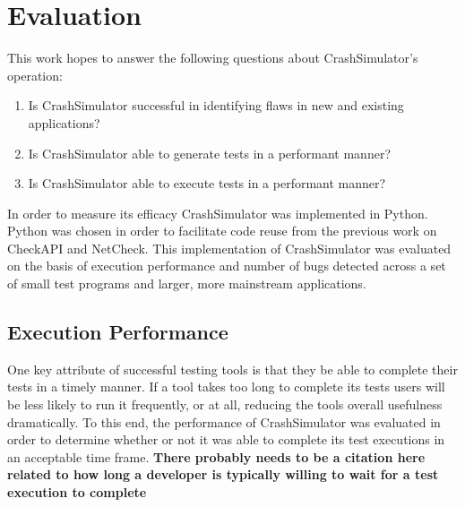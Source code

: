 

\section{Evaluation}

    This work hopes to answer the following questions about CrashSimulator's operation:

        \begin{enumerate}
            \item{Is CrashSimulator successful in identifying flaws in new and existing applications?}
            \item{Is CrashSimulator able to generate tests in a performant manner?}
            \item{Is CrashSimulator able to execute tests in a performant manner?}
        \end{enumerate}
        In order to measure its efficacy CrashSimulator was implemented in Python. Python was chosen in order to facilitate
    code reuse from the previous work on CheckAPI and NetCheck. This implementation of CrashSimulator was evaluated on
    the basis of execution performance and number of bugs detected across a set of small test programs and larger, more
    mainstream applications.

    \subsection{Execution Performance}

        One key attribute of successful testing tools is that they be able to complete their tests in a timely manner.
        If a tool takes too long to complete its tests users will be less likely to run it frequently, or at all,
        reducing the tools overall usefulness dramatically. To this end, the performance of CrashSimulator was evaluated
        in order to determine whether or not it was able to complete its test executions in an acceptable time frame.
        \textbf{There probably needs to be a citation here related to how long a developer is typically willing to wait
        for a test execution to complete}

